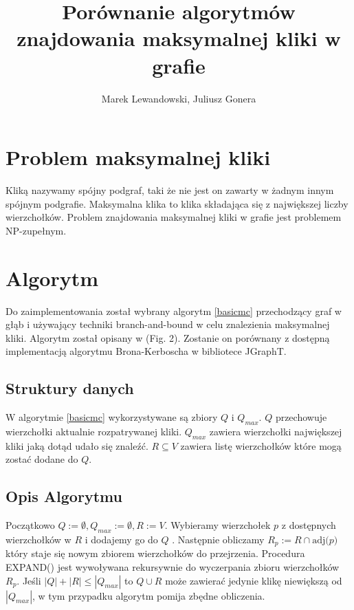 \documentclass[12pt, a4paper]{article}
\author{Marek Lewandowski, Juliusz Gonera}
\date{}
\title{Porównanie algorytmów znajdowania maksymalnej kliki w grafie}
\begin{document}
\maketitle

\section{Problem maksymalnej kliki}
\label{sec-1}
Kliką nazywamy spójny podgraf, taki że nie jest on zawarty w żadnym innym spójnym podgrafie. Maksymalna klika to klika składająca się z największej liczby wierzchołków. Problem znajdowania maksymalnej kliki w grafie jest problemem NP-zupełnym.

\section{Algorytm}
\label{sec-2}
Do zaimplementowania został wybrany algorytm \ref{basicmc} przechodzący graf w głąb i używający techniki branch-and-bound w celu znalezienia maksymalnej kliki. Algorytm został opisany w \citep{bioinf} (Fig. 2). Zostanie on porównany z dostępną implementacją algorytmu Brona-Kerboscha w bibliotece JGraphT\citep{jgrapht}.

\subsection{Struktury danych}

W algorytmie \ref{basicmc} wykorzystywane są zbiory $Q$ i $Q_{max}$. $Q$ przechowuje wierzchołki aktualnie rozpatrywanej kliki. $Q_{max}$ zawiera wierzchołki największej kliki jaką dotąd udało się znaleźć. $R \subseteq V $ zawiera listę wierzchołków które mogą zostać dodane do $Q$.

\subsection{Opis Algorytmu}

Początkowo $Q := \emptyset, Q_{max} := \emptyset, R := V$. Wybieramy wierzchołek $p$ z dostępnych wierzchołków w $R$ i dodajemy go do $Q$ . Następnie obliczamy $R_{p} := R \cap \text{adj(}p\text{)}$ który staje się nowym zbiorem wierzchołków do przejrzenia. Procedura EXPAND() jest wywoływana rekursywnie do wyczerpania zbioru wierzchołków $R_{p}$. Jeśli $|Q|+|R| \leq |Q_{max}|$ to $Q \cup R$ może zawierać jedynie klikę niewiększą od $|Q_{max}|$, w tym przypadku algorytm pomija zbędne obliczenia.
\end{document}
